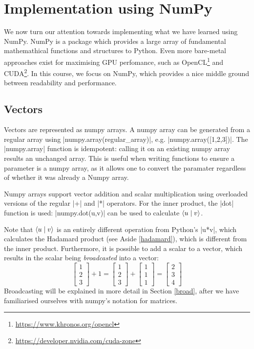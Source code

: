 \section{Implementation using NumPy}
We now turn our attention towards implementing what we have learned using NumPy. NumPy is a package which provides a large array of fundamental mathemathical functions and structures to Python. Even more bare-metal approaches exist for maximising GPU perfomance, such as OpenCL\footnote{\url{https://www.khronos.org/opencl}} and CUDA\footnote{\url{https://developer.nvidia.com/cuda-zone}}. In this course, we focus on NumPy, which provides a nice middle ground between readability and performance.

\subsection{Vectors}
Vectors are represented as numpy arrays. A numpy array can be generated from a regular array using \py|numpy.array(regular_array)|, e.g. \py|numpy.array([1,2,3])|. The \py|numpy.array| function is idempotent: calling it on an existing numpy array results an unchanged array. This is useful when writing functions to ensure a parameter is a numpy array, as it allows one to convert the paramater regardless of whether it was already a Numpy array.

Numpy arrays support vector addition and scalar multiplication using overloaded versions of the regular \py|+| and \py|*| operators. For the inner product, the \py|dot| function is used: \py|numpy.dot(u,v)| can be used to calculate $\langle u \mid v \rangle$.

Note that $\langle u \mid v \rangle$ is an entirely different operation from Python's \py|u*v|, which calculates the Hadamard product (see Aside \ref{hadamard}), which is different from the inner product. Furthermore, it is possible to add a scalar to a vector, which results in the scalar being \emph{broadcasted} into a vector:
$$\begin{bmatrix}1\\2\\3\end{bmatrix} + 1 = \begin{bmatrix}1\\2\\3\end{bmatrix}+\begin{bmatrix}1\\1\\1\end{bmatrix} = \begin{bmatrix}2\\3\\4\end{bmatrix}$$
  Broadcasting will be explained in more detail in Section \ref{broad}, after we have familiarised ourselves with numpy's notation for matrices.

